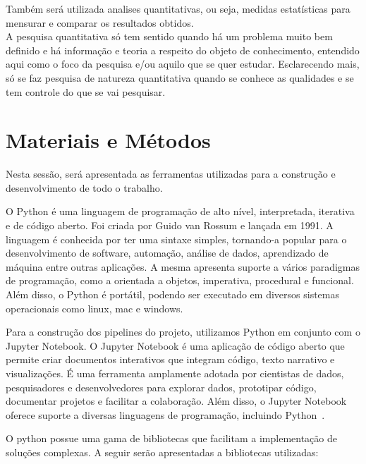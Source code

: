 Também será utilizada analises quantitativas, ou seja, medidas estatísticas para mensurar e comparar os resultados obtidos.\\
A pesquisa quantitativa só tem sentido quando há um problema muito bem definido e há informação e teoria a respeito do objeto de conhecimento, entendido aqui como o foco da pesquisa e/ou aquilo que se quer estudar. Esclarecendo mais, só se faz pesquisa de natureza quantitativa quando se conhece as qualidades e se tem controle do que se vai pesquisar.~\cite{da_silva_pesquisa_2014}

\section{Materiais e Métodos}
Nesta sessão, será apresentada as ferramentas utilizadas para a construção e desenvolvimento de todo o trabalho.

O Python é uma linguagem de programação de alto nível, interpretada, iterativa e de código aberto. Foi criada por Guido van Rossum e lançada em 1991. A linguagem é conhecida por ter uma sintaxe simples, tornando-a popular para o desenvolvimento de software, automação, análise de dados, aprendizado de máquina entre outras aplicações. A mesma apresenta suporte a vários paradigmas de programação, como a orientada a objetos, imperativa, procedural e funcional. Além disso, o Python é portátil, podendo ser executado em diversos sistemas operacionais como linux, mac e windows.~\cite{python-reference}

Para a construção dos pipelines do projeto, utilizamos Python em conjunto com o Jupyter Notebook. O Jupyter Notebook é uma aplicação de código aberto que permite criar documentos interativos que integram código, texto narrativo e visualizações. É uma ferramenta amplamente adotada por cientistas de dados, pesquisadores e desenvolvedores para explorar dados, prototipar código, documentar projetos e facilitar a colaboração. Além disso, o Jupyter Notebook oferece suporte a diversas linguagens de programação, incluindo Python~\cite{jupyter-notebook}.

O python possue uma gama de bibliotecas que facilitam a implementação de soluções complexas. A seguir serão apresentadas a bibliotecas utilizadas:

